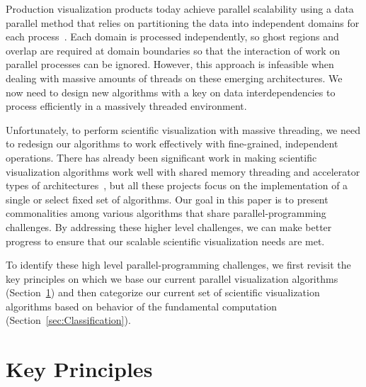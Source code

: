 \documentclass{sig-alternate}
\newcommand*{\lcite}[1]{~\cite{#1}}
\begin{document}
Production visualization products today achieve parallel scalability using
a data parallel method that relies on partitioning the data into
independent domains for each process\lcite{Ahrens2001}. Each domain is
processed independently, so ghost regions and overlap are required at
domain boundaries so that the interaction of work on parallel processes can
be ignored. However, this approach is infeasible when dealing with massive
amounts of threads on these emerging architectures. We now need to design
new algorithms with a key on data interdependencies to process efficiently
in a massively threaded environment.

Unfortunately, to perform scientific visualization with massive threading,
we need to redesign our algorithms to work effectively with fine-grained,
independent operations. There has already been significant work in making
scientific visualization algorithms work well with shared memory threading
and accelerator types of
architectures\lcite{PISTON,Dyken2008,Maynard2013,EAVL,Meredith2012}, but
all these projects focus on the implementation of a single or select fixed
set of algorithms. Our goal in this paper is to present commonalities among
various algorithms that share parallel-programming challenges. By
addressing these higher level challenges, we can make better progress to
ensure that our scalable scientific visualization needs are met.

To identify these high level parallel-programming challenges, we first
revisit the key principles on which we base our current parallel
visualization algorithms (Section~\ref{sec:KeyPrinciples}) and then
categorize our current set of scientific visualization algorithms based on
behavior of the fundamental computation
(Section~\ref{sec:Classification}).


\section{Key Principles}
\label{sec:KeyPrinciples}
\end{document}

